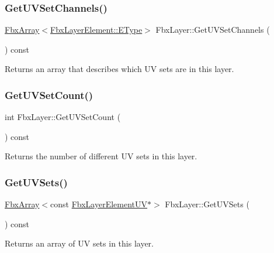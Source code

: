 \subsubsection{\texorpdfstring{Get\+U\+V\+Set\+Channels()}{GetUVSetChannels()}}
{\footnotesize\ttfamily \hyperlink{class_fbx_array}{Fbx\+Array}$<$\hyperlink{class_fbx_layer_element_a8c95c5cd880b56c776acd379bd86f42c}{Fbx\+Layer\+Element\+::\+E\+Type}$>$ Fbx\+Layer\+::\+Get\+U\+V\+Set\+Channels (\begin{DoxyParamCaption}{ }\end{DoxyParamCaption}) const}

Returns an array that describes which UV sets are in this layer. \mbox{\label{class_fbx_layer_a4c3477c65c49df6843f9120496026174}} 
\subsubsection{\texorpdfstring{Get\+U\+V\+Set\+Count()}{GetUVSetCount()}}
{\footnotesize\ttfamily int Fbx\+Layer\+::\+Get\+U\+V\+Set\+Count (\begin{DoxyParamCaption}{ }\end{DoxyParamCaption}) const}

Returns the number of different UV sets in this layer. \mbox{\label{class_fbx_layer_a833ec1951767dc72e73d451e3777ba5a}} 
\subsubsection{\texorpdfstring{Get\+U\+V\+Sets()}{GetUVSets()}}
{\footnotesize\ttfamily \hyperlink{class_fbx_array}{Fbx\+Array}$<$const \hyperlink{class_fbx_layer_element_u_v}{Fbx\+Layer\+Element\+UV}$\ast$$>$ Fbx\+Layer\+::\+Get\+U\+V\+Sets (\begin{DoxyParamCaption}{ }\end{DoxyParamCaption}) const}

Returns an array of UV sets in this layer. \mbox{\label{class_fbx_layer_a050877e12380125dda894a6136f04564}} 
